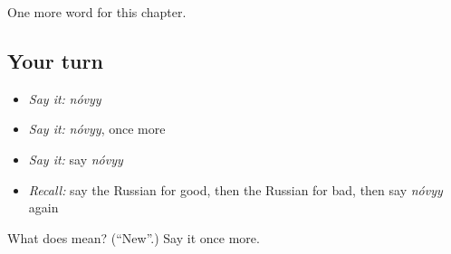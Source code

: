 \begin{grammarlens}[title={What you've built}]
One more word for this chapter.
\end{grammarlens}

\subsection*{Your turn}
\begin{itemize}
\raggedright
  \item \emph{Say it:} \emph{nóvyy}
  \item \emph{Say it:} \emph{nóvyy}, once more
  \item \emph{Say it:} say \emph{nóvyy}
  \item \emph{Recall:} say the Russian for good, then the Russian for bad, then say \emph{nóvyy} again
\end{itemize}

\begin{tcolorbox}[breakable,colback=teal!4,colframe=teal!35!black,title={Before you move on}]
What does  mean? (\textquotedblleft{}New\textquotedblright{}.) Say it once more.
\end{tcolorbox}
